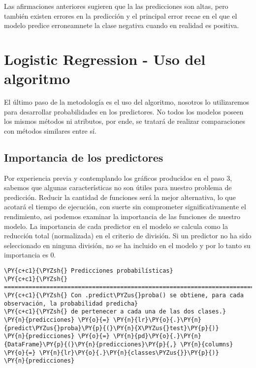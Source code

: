 Las afirmaciones anteriores sugieren que la las predicciones son altas,
pero también existen errores en la predicción y el principal error recae
en el que el modelo predice erroneamnete la clase negativa cuando en
realidad es positiva.

    \hypertarget{logistic-regression---uso-del-algoritmo}{%
\section{Logistic Regression - Uso del
algoritmo}\label{logistic-regression---uso-del-algoritmo}}

El último paso de la metodología es el uso del algoritmo, nosotros lo
utilizaremos para desarrollar probabilidades en los predictores. No
todos los modelos poseen los mismos métodos ni atributos, por ende, se
tratará de realizar comparaciones con métodos similares entre sí.

    \hypertarget{importancia-de-los-predictores}{%
\subsection{Importancia de los
predictores}\label{importancia-de-los-predictores}}

Por experiencia previa y contemplando los gráficos producidos en el paso
3, sabemos que algunas características no son útiles para nuestro
problema de predicción. Reducir la cantidad de funciones será la mejor
alternativa, lo que acotará el tiempo de ejecución, con suerte sin
comprometer significativamente el rendimiento, asi podemos examinar la
importancia de las funciones de nuestro modelo. La importancia de cada
predictor en el modelo se calcula como la reducción total (normalizada)
en el criterio de división. Si un predictor no ha sido seleccionado en
ninguna división, no se ha incluido en el modelo y por lo tanto su
importancia es 0.

    \begin{tcolorbox}[breakable, size=fbox, boxrule=1pt, pad at break*=1mm,colback=cellbackground, colframe=cellborder]
\begin{Verbatim}[commandchars=\\\{\}]
\PY{c+c1}{\PYZsh{} Predicciones probabilísticas}
\PY{c+c1}{\PYZsh{} ==============================================================================}
\PY{c+c1}{\PYZsh{} Con .predict\PYZus{}proba() se obtiene, para cada observación, la probabilidad predicha}
\PY{c+c1}{\PYZsh{} de pertenecer a cada una de las dos clases.}
\PY{n}{predicciones} \PY{o}{=} \PY{n}{lr}\PY{o}{.}\PY{n}{predict\PYZus{}proba}\PY{p}{(}\PY{n}{X\PYZus{}test}\PY{p}{)}
\PY{n}{predicciones} \PY{o}{=} \PY{n}{pd}\PY{o}{.}\PY{n}{DataFrame}\PY{p}{(}\PY{n}{predicciones}\PY{p}{,} \PY{n}{columns} \PY{o}{=} \PY{n}{lr}\PY{o}{.}\PY{n}{classes\PYZus{}}\PY{p}{)}
\PY{n}{predicciones}
\end{Verbatim}
\end{tcolorbox}

